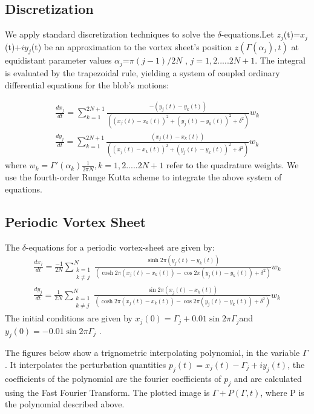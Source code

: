\documentclass[12pt]{article}
\begin{document}
\subsection{Discretization}

We apply standard discretization techniques to solve the $\delta$-equations.Let $z_j$(t)=$x_j$(t)+$iy_j$(t) be an approximation to the vortex sheet's position $z(\Gamma(\alpha_j),t)$ at equidistant parameter values $\alpha_j$=$\pi(j-1)/2N$ , $j=1,2.....2N+1$. The integral is evaluated by the trapezoidal rule, yielding a system of coupled ordinary differential equations for the blob's motions:

\begin{subequations}
\begin{align}
\frac{d x_j}{d t} = \sum_{k=1}^{2N+1}{\frac{-(y_j(t)-y_k(t))}{((x_j(t)-x_k(t))^2 + (y_j(t)-y_k(t))^2 + \delta^2)}}w_k\\
\frac{d y_j}{d t} = \sum_{k=1}^{2N+1}{\frac{(x_j(t)-x_k(t))}{((x_j(t)-x_k(t))^2 + (y_j(t)-y_k(t))^2 + \delta^2)}}w_k
\end{align}
\end{subequations}
where $w_k=\Gamma'(\alpha_k)\frac{1}{2\pi N},k=1,2.....2N+1$ refer to the quadrature weights. We use the fourth-order Runge Kutta scheme to integrate the above system of equations.
\subsection{Periodic Vortex Sheet}
The $\delta$-equations for a periodic vortex-sheet are given by:
\begin{subequations}
\begin{align}
\frac{d x_j}{d t}  =\frac{-1}{2N} \sum_{{\substack{k=1 \\ k\neq j}}}^{N}{\frac{\sinh2\pi(y_j(t)-y_k(t))}{(\cosh2\pi(x_j(t)-x_k(t)) - \cos2\pi(y_j(t)-y_k(t)) + \delta^2)}}w_k\\
\frac{d y_j}{d t}=\frac{1}{2N} \sum_{{\substack{k=1 \\ k\neq j}}}^{N}{\frac{\sin2\pi(x_j(t)-x_k(t))}{(\cosh2\pi(x_j(t)-x_k(t)) - \cos2\pi(y_j(t)-y_k(t)) + \delta^2)}}w_k
\end{align}
\end{subequations}
The initial conditions are given by
$x_j(0)=\Gamma_j+0.01\sin2\pi\Gamma_j$and $y_j(0)=-0.01\sin2\pi\Gamma_j$ . 

The figures below show a trignometric interpolating polynomial, in the variable $\Gamma$. It interpolates the perturbation quantities $p_j(t)=x_j(t)-\Gamma_j + iy_j(t)$, the coefficients of the polynomial are the fourier coefficients of $p_j$ and are calculated using the Fast Fourier Transform. The plotted image is $\Gamma + P(\Gamma,t)$, where P is the polynomial described above.
\end{document}

